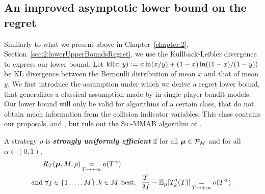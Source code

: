 \subsection{An improved asymptotic lower bound on the regret}
\label{sub:5:betterLowerBound}

Similarly to what we present above in Chapter~\ref{chapter:2}, Section~\ref{sec:2:lowerUpperBoundsRegret},
we use the Kullback-Leibler divergence to express our lower bound.
Let $\mathrm{kl}(x,y) := x\ln(x/y) + (1-x)\ln((1-x)/(1-y))$ be KL divergence between the Bernoulli distribution of mean $x$ and that of mean $y$.
%
We first introduce the assumption under which we derive a regret lower bound, that generalizes a classical assumption made by \cite{LaiRobbins85} in single-player bandit models.
Our lower bound will only be valid for algorithms of a certain class, that do not obtain much information from the collision indicator variables.
This class contains our proposals, \RandTopM{} and \MCTopM, but rule out the \textsc{Sic-MMAB} algorithm of \cite{BoursierPerchet18}.

\begin{definition}\label{def:5:DecentralizedUniformEfficiency}
  A strategy $\rho$  is \emph{\textbf{strongly uniformly efficient}} if for all $\boldsymbol{\mu} \in \mathcal{P}_M$ and for all $\alpha \in (0,1)$,
  \begin{align}
    & R_T(\boldsymbol{\mu},M,\rho) \mathop{=}\limits_{T \to +\infty} o(T^\alpha) \\
    \text{and} & \;
    \forall j \in \{1,\dots,M\}, k \in M\text{-}\mathrm{best}, \;\;
    \frac{T}{M}
    - \mathbb{E}_{\mu}[T^j_k(T)] \mathop{=}\limits_{T \to +\infty} o(T^{\alpha}).
    \label{eq:5:SUE}
  \end{align}
\end{definition}


